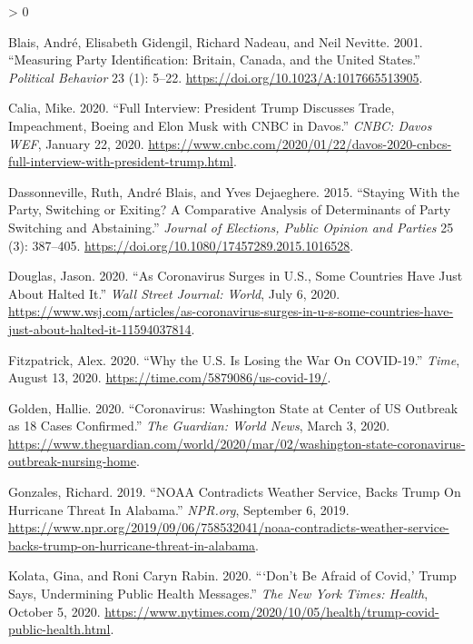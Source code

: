 \documentclass[
  12pt,
]{article}
\newlength{\cslhangindent}
\newenvironment{CSLReferences}[2] %
 {%
  \setlength{\parindent}{0pt}
  \ifodd #1 \everypar{\setlength{\hangindent}{\cslhangindent}}\ignorespaces\fi
  \ifnum #2 > 0
  \setlength{\parskip}{#2\baselineskip}
  \fi
 }%
 {}
\begin{document}
\hypertarget{refs}{}
\begin{CSLReferences}{1}{0}
\leavevmode\hypertarget{ref-Blais2001}{}%
Blais, André, Elisabeth Gidengil, Richard Nadeau, and Neil Nevitte. 2001. {``Measuring {Party Identification}: {Britain}, {Canada}, and the {United States}.''} \emph{Political Behavior} 23 (1): 5--22. \url{https://doi.org/10.1023/A:1017665513905}.

\leavevmode\hypertarget{ref-Calia2020}{}%
Calia, Mike. 2020. {``Full Interview: {President Trump} Discusses Trade, Impeachment, {Boeing} and {Elon Musk} with {CNBC} in {Davos}.''} \emph{CNBC: Davos WEF}, January 22, 2020. \url{https://www.cnbc.com/2020/01/22/davos-2020-cnbcs-full-interview-with-president-trump.html}.

\leavevmode\hypertarget{ref-Dassonneville2015}{}%
Dassonneville, Ruth, André Blais, and Yves Dejaeghere. 2015. {``Staying {With} the {Party}, {Switching} or {Exiting}? {A Comparative Analysis} of {Determinants} of {Party Switching} and {Abstaining}.''} \emph{Journal of Elections, Public Opinion and Parties} 25 (3): 387--405. \url{https://doi.org/10.1080/17457289.2015.1016528}.

\leavevmode\hypertarget{ref-Douglas2020}{}%
Douglas, Jason. 2020. {``As {Coronavirus Surges} in {U}.{S}., {Some Countries Have Just About Halted It}.''} \emph{Wall Street Journal: World}, July 6, 2020. \url{https://www.wsj.com/articles/as-coronavirus-surges-in-u-s-some-countries-have-just-about-halted-it-11594037814}.

\leavevmode\hypertarget{ref-Fitzpatrick2020}{}%
Fitzpatrick, Alex. 2020. {``Why the {U}.{S}. {Is Losing} the {War On COVID}-19.''} \emph{Time}, August 13, 2020. \url{https://time.com/5879086/us-covid-19/}.

\leavevmode\hypertarget{ref-Golden2020}{}%
Golden, Hallie. 2020. {``Coronavirus: {Washington} State at Center of {US} Outbreak as 18 Cases Confirmed.''} \emph{The Guardian: World News}, March 3, 2020. \url{https://www.theguardian.com/world/2020/mar/02/washington-state-coronavirus-outbreak-nursing-home}.

\leavevmode\hypertarget{ref-Gonzales2019}{}%
Gonzales, Richard. 2019. {``{NOAA Contradicts Weather Service}, {Backs Trump On Hurricane Threat In Alabama}.''} \emph{NPR.org}, September 6, 2019. \url{https://www.npr.org/2019/09/06/758532041/noaa-contradicts-weather-service-backs-trump-on-hurricane-threat-in-alabama}.

\leavevmode\hypertarget{ref-Kolata2020}{}%
Kolata, Gina, and Roni Caryn Rabin. 2020. {``{`{Don}'t {Be Afraid} of {Covid},'} {Trump Says}, {Undermining Public Health Messages}.''} \emph{The New York Times: Health}, October 5, 2020. \url{https://www.nytimes.com/2020/10/05/health/trump-covid-public-health.html}.


\end{CSLReferences}
\end{document}
